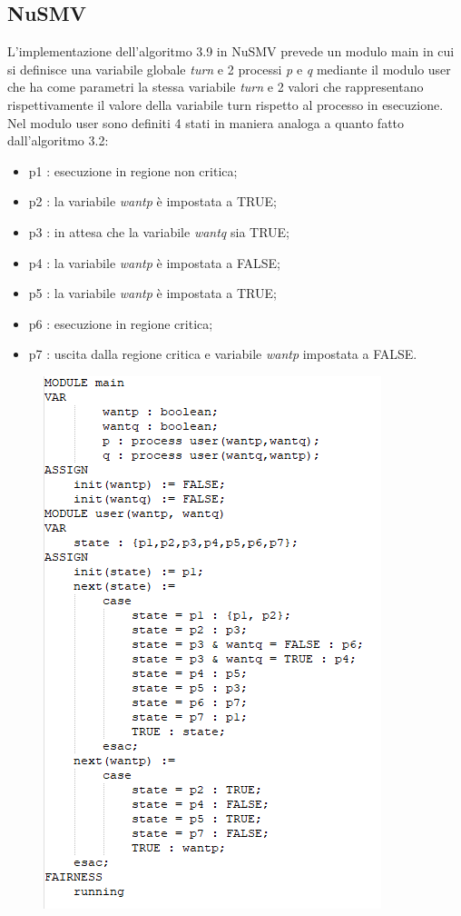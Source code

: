 \documentclass{article}
\begin{document}
\subsection{NuSMV}
L'implementazione dell'algoritmo 3.9 in NuSMV prevede un modulo main in cui si definisce una variabile globale \textit{turn} e 2 processi \textit{p} e \textit{q} mediante il modulo user che ha come parametri la stessa variabile \textit{turn} e 2 valori che rappresentano rispettivamente il valore della variabile turn rispetto al processo in esecuzione. 
\\Nel modulo user sono definiti 4 stati in maniera analoga a quanto fatto dall'algoritmo 3.2:

\begin{itemize}
    \item p1 : esecuzione in regione non critica;
    \item p2 : la variabile \textit{wantp} è impostata a TRUE;
    \item p3 : in attesa che la variabile \textit{wantq} sia TRUE;
    \item p4 : la variabile \textit{wantp} è impostata a FALSE;
    \item p5 : la variabile \textit{wantp} è impostata a TRUE;
    \item p6 : esecuzione in regione critica;
    \item p7 : uscita dalla regione critica e variabile \textit{wantp} impostata a FALSE.
\end{itemize}
\begin{figure}[h] 
\centering
\includegraphics[scale=0.95]{3.9nusmv.png}
\end{figure}
\end{document}
